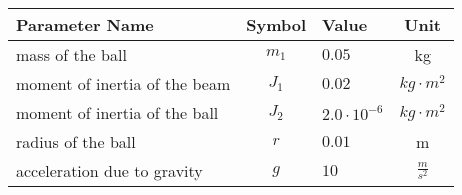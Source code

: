\begin{tabular}{lclc}
\hline
 Parameter Name                &  Symbol  & Value               &      Unit       \\
\hline
 mass of the ball              & $m_{1}$  & $0.05$              &       kg        \\
 moment of inertia of the beam & $J_{1}$  & $0.02$              & $kg \cdot m^2$  \\
 moment of inertia of the ball & $J_{2}$  & $2.0 \cdot 10^{-6}$ & $kg \cdot m^2$  \\
 radius of the ball            &   $r$    & $0.01$              &        m        \\
 acceleration due to gravity   &   $g$    & $10$                & $\frac{m}{s^2}$ \\
\hline
\end{tabular}